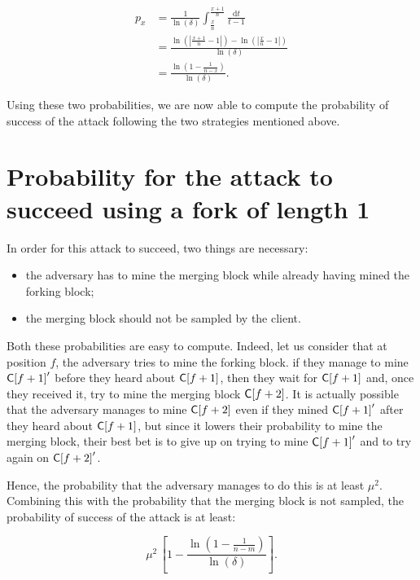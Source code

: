         \begin{align*}
          p_x &= \frac{1}{\ln(\delta)}\int_{\frac{x}{n}}^{\frac{x+1}{n}}\frac{\mathrm{d}t}{t-1}\\
              &= \frac{\ln\left(\left|\frac{x+1}{n}-1\right|\right)-\ln\left(\left|\frac{x}{n}-1\right|\right)}{\ln(\delta)}\\
              &= \frac{\ln\left(1-\frac{1}{n-x}\right)}{\ln(\delta)}.
        \end{align*}

        Using these two probabilities, we are now able to compute the probability of success of the attack following the two strategies mentioned above.

        \section{Probability for the attack to succeed using a fork of length 1}
          In order for this attack to succeed, two things are necessary:

          \begin{itemize}
            \item the adversary has to mine the merging block while already having mined the forking block;
            \item the merging block should not be sampled by the client.
          \end{itemize}

          Both these probabilities are easy to compute. Indeed, let us consider that at position \(f\), the adversary tries to mine the forking block. if they manage to mine \(\mathsf{C[}f+1\mathsf{]}'\) before they heard about \(\mathsf{C[}f+1\mathsf{]}\), then they wait for \(\mathsf{C[}f+1\mathsf{]}\) and, once they received it, try to mine the merging block \(\mathsf{C[}f+2\mathsf{]}\). It is actually possible that the adversary manages to mine \(\mathsf{C[}f+2\mathsf{]}\) even if they mined \(\mathsf{C[}f+1\mathsf{]}'\) after they heard about \(\mathsf{C[}f+1\mathsf{]}\), but since it lowers their probability to mine the merging block, their best bet is to give up on trying to mine \(\mathsf{C[}f+1\mathsf{]}'\) and to try again on \(\mathsf{C[}f+2\mathsf{]}'\).

          Hence, the probability that the adversary manages to do this is at least \(\mu^2\). Combining this with the probability that the merging block is not sampled, the probability of success of the attack is at least:

          \[
                  \mu^2\,\left[1-\frac{\ln\left(1-\frac{1}{n-m}\right)}{\ln(\delta)}\right]
          .\] 

